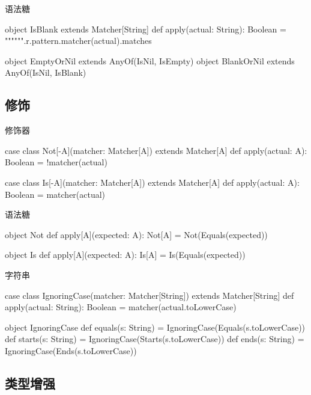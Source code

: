 \begin{frame}[fragile]{语法糖}
  \begin{scala}
object IsBlank extends Matcher[String] { 
  def apply(actual: String): Boolean = 
    """\s*""".r.pattern.matcher(actual).matches
}

object EmptyOrNil extends AnyOf(IsNil, IsEmpty)
object BlankOrNil extends AnyOf(IsNil, IsBlank)
  \end{scala}
\end{frame}

\subsection{修饰}

\begin{frame}[fragile]{修饰器}
  \begin{scala}
case class Not[-A](matcher: Matcher[A]) extends Matcher[A] {
  def apply(actual: A): Boolean = !matcher(actual)
}

case class Is[-A](matcher: Matcher[A]) extends Matcher[A] {
  def apply(actual: A): Boolean = matcher(actual)
}
  \end{scala}
\end{frame}

\begin{frame}[fragile]{语法糖}
  \begin{scala}
object Not {
  def apply[A](expected: A): Not[A] = Not(Equals(expected))
}

object Is {
  def apply[A](expected: A): Is[A] = Is(Equals(expected))
}
  \end{scala}
\end{frame}

\begin{frame}[fragile]{字符串}
  \begin{scala}
case class IgnoringCase(matcher: Matcher[String]) extends Matcher[String] {
  def apply(actual: String): Boolean = matcher(actual.toLowerCase)
}

object IgnoringCase {
  def equals(s: String) = IgnoringCase(Equals(s.toLowerCase))
  def starts(s: String) = IgnoringCase(Starts(s.toLowerCase))
  def ends(s: String)   = IgnoringCase(Ends(s.toLowerCase))
} 
  \end{scala}
\end{frame}

\subsection{类型增强}

